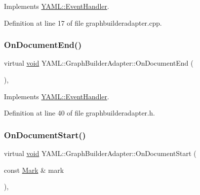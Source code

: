 Implements \mbox{\hyperlink{class_y_a_m_l_1_1_event_handler_a3459009c2aad49b3226e009fc06d33b6}{Y\+A\+M\+L\+::\+Event\+Handler}}.



Definition at line 17 of file graphbuilderadapter.\+cpp.

\mbox{\label{class_y_a_m_l_1_1_graph_builder_adapter_a9f0b8ba153afc80ba449dea7a17d2f1f}} 
\subsubsection{\texorpdfstring{OnDocumentEnd()}{OnDocumentEnd()}}
{\footnotesize\ttfamily virtual \mbox{\hyperlink{glad_8h_a950fc91edb4504f62f1c577bf4727c29}{void}} Y\+A\+M\+L\+::\+Graph\+Builder\+Adapter\+::\+On\+Document\+End (\begin{DoxyParamCaption}{ }\end{DoxyParamCaption})\hspace{0.3cm}{\ttfamily [inline]}, {\ttfamily [virtual]}}



Implements \mbox{\hyperlink{class_y_a_m_l_1_1_event_handler_afc0d547e87f9c1f63ba8087aabd7e34a}{Y\+A\+M\+L\+::\+Event\+Handler}}.



Definition at line 40 of file graphbuilderadapter.\+h.

\mbox{\label{class_y_a_m_l_1_1_graph_builder_adapter_aae52d2e2c6d73fd4df9b7979cdee8de6}} 
\subsubsection{\texorpdfstring{OnDocumentStart()}{OnDocumentStart()}}
{\footnotesize\ttfamily virtual \mbox{\hyperlink{glad_8h_a950fc91edb4504f62f1c577bf4727c29}{void}} Y\+A\+M\+L\+::\+Graph\+Builder\+Adapter\+::\+On\+Document\+Start (\begin{DoxyParamCaption}\item[{const \mbox{\hyperlink{struct_y_a_m_l_1_1_mark}{Mark}} \&}]{mark }\end{DoxyParamCaption})\hspace{0.3cm}{\ttfamily [inline]}, {\ttfamily [virtual]}}



